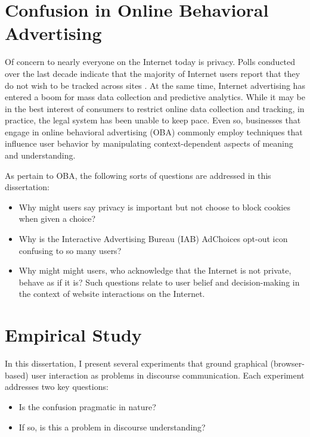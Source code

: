 \section{Confusion in Online Behavioral Advertising}
\label{confusioninonlinebehavioraladvertising}

Of concern to nearly everyone on the Internet today is privacy. Polls conducted over the last decade indicate that the majority of Internet users report that they do not wish to be tracked across sites  \citep{Truste:2012uc}.  At the same time, Internet advertising has entered a boom for mass data collection and predictive analytics. While it may be in the best interest of consumers to restrict online data collection and tracking, in practice, the legal system has been unable to keep pace. Even so, businesses that engage in online behavioral advertising (OBA) commonly employ techniques that influence user behavior by manipulating context-dependent aspects of meaning and understanding.

As pertain to OBA, the following sorts of questions are addressed in this dissertation:

\begin{itemize}
\item Why might users say privacy is important but not choose to block cookies when given a choice?

\item Why is the Interactive Advertising Bureau (IAB) AdChoices opt-out icon confusing to so many users?

\item Why might might users, who acknowledge that the Internet is not private, behave as if it is?
Such questions relate to user belief and decision-making in the context of website interactions on the Internet.

\end{itemize}

\section{Empirical Study}
\label{empiricalstudy}

In this dissertation, I present several experiments that ground graphical (browser-based) user interaction as problems in discourse communication. Each experiment addresses two key questions: 

\begin{itemize}
\item Is the confusion pragmatic in nature?

\item If so, is this a problem in discourse understanding?

\end{itemize}

